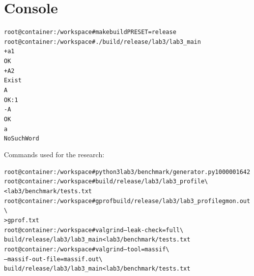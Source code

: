







\pagebreak

\section{Console}

\begin{alltt}
root@container:/workspace# make build PRESET=release
root@container:/workspace# ./build/release/lab3/lab3_main
+ a 1
OK
+ A 2
Exist
A
OK: 1
- A
OK
a
NoSuchWord
\end{alltt}

Commands used for the research:

{\footnotesize
\begin{alltt}
root@container:/workspace# python3 lab3/benchmark/generator.py 100000 16 42
root@container:/workspace# build/release/lab3/lab3_profile \textbackslash{}
    < lab3/benchmark/tests.txt
root@container:/workspace# gprof build/release/lab3/lab3_profile gmon.out \textbackslash{}
    > gprof.txt
root@container:/workspace# valgrind --leak-check=full \textbackslash{}
    build/release/lab3/lab3_main < lab3/benchmark/tests.txt
root@container:/workspace# valgrind --tool=massif \textbackslash{}
    --massif-out-file=massif.out \textbackslash{}
    build/release/lab3/lab3_main < lab3/benchmark/tests.txt
\end{alltt}
}

\pagebreak
